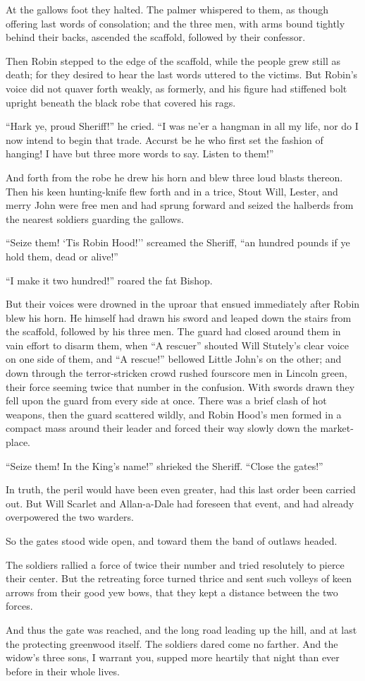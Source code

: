 At the gallows foot they halted. The palmer whispered to them, as though
offering last words of consolation; and the three men, with arms bound
tightly behind their backs, ascended the scaffold, followed by their
confessor.

Then Robin stepped to the edge of the scaffold, while the people grew
still as death; for they desired to hear the last words uttered to the
victims. But Robin's voice did not quaver forth weakly, as formerly, and
his figure had stiffened bolt upright beneath the black robe that
covered his rags.

``Hark ye, proud Sheriff!'' he cried. ``I was ne'er a hangman in all my
life, nor do I now intend to begin that trade. Accurst be he who first
set the fashion of hanging! I have but three more words to say. Listen
to them!''

And forth from the robe he drew his horn and blew three loud blasts
thereon. Then his keen hunting-knife flew forth and in a trice, Stout
Will, Lester, and merry John were free men and had sprung forward and
seized the halberds from the nearest soldiers guarding the gallows.

``Seize them! `Tis Robin Hood!'' screamed the Sheriff, ``an hundred
pounds if ye hold them, dead or alive!''

``I make it two hundred!'' roared the fat Bishop.

But their voices were drowned in the uproar that ensued immediately
after Robin blew his horn. He himself had drawn his sword and leaped
down the stairs from the scaffold, followed by his three men. The guard
had closed around them in vain effort to disarm them, when ``A rescuer''
shouted Will Stutely's clear voice on one side of them, and ``A
rescue!'' bellowed Little John's on the other; and down through the
terror-stricken crowd rushed fourscore men in Lincoln green, their force
seeming twice that number in the confusion. With swords drawn they fell
upon the guard from every side at once. There was a brief clash of hot
weapons, then the guard scattered wildly, and Robin Hood's men formed in
a compact mass around their leader and forced their way slowly down the
market-place.

``Seize them! In the King's name!'' shrieked the Sheriff. ``Close the
gates!''

In truth, the peril would have been even greater, had this last order
been carried out. But Will Scarlet and Allan-a-Dale had foreseen that
event, and had already overpowered the two warders.

So the gates stood wide open, and toward them the band of outlaws
headed.

The soldiers rallied a force of twice their number and tried resolutely
to pierce their center. But the retreating force turned thrice and sent
such volleys of keen arrows from their good yew bows, that they kept a
distance between the two forces.

And thus the gate was reached, and the long road leading up the hill,
and at last the protecting greenwood itself. The soldiers dared come no
farther. And the widow's three sons, I warrant you, supped more heartily
that night than ever before in their whole lives.
